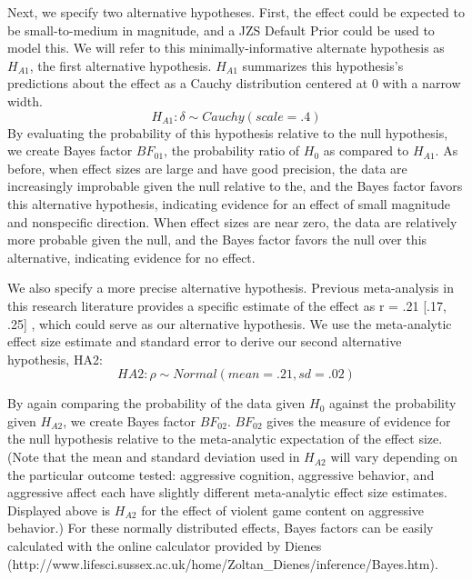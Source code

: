 \documentclass[fignum,nobf,man]{apa}
\begin{document}
Next, we specify two alternative hypotheses. First, the effect could be expected to be small-to-medium in magnitude, and a JZS Default Prior could be used to model this. We will refer to this minimally-informative alternate hypothesis as $H_{A1}$, the first alternative hypothesis. $H_{A1}$ summarizes this hypothesis's predictions about the effect as a Cauchy distribution centered at 0 with a narrow width.
\begin{equation}
H_{A1}: \delta{} \sim{} Cauchy(scale = .4) 
\end{equation}
By evaluating the probability of this hypothesis relative to the null hypothesis, we create Bayes factor $BF_{01}$, the probability ratio of $H_0$ as compared to $H_{A1}$. As before, when effect sizes are large and have good precision, the data are increasingly improbable given the null relative to the, and the Bayes factor favors this alternative hypothesis, indicating evidence for an effect of small magnitude and nonspecific direction. When effect sizes are near zero, the data are relatively more probable given the null, and the Bayes factor favors the null over this alternative, indicating evidence for no effect. 

We also specify a more precise alternative hypothesis. Previous meta-analysis in this research literature provides a specific estimate of the effect as r = .21 [.17, .25] \citep{Anderson:etal:2010}, which could serve as our alternative hypothesis.  We use the meta-analytic effect size estimate and standard error to derive our second alternative hypothesis, HA2:
\begin{equation}
HA2: \rho{} \sim{} Normal(mean=.21, sd=.02)
\end{equation}

By again comparing the probability of the data given $H_0$ against the probability given $H_{A2}$, we create Bayes factor $BF_{02}$. $BF_{02}$ gives the measure of evidence for the null hypothesis relative to the meta-analytic expectation of the effect size. (Note that the mean and standard deviation used in $H_{A2}$ will vary depending on the particular outcome tested: aggressive cognition, aggressive behavior, and aggressive affect each have slightly different meta-analytic effect size estimates. Displayed above is $H_{A2}$ for the effect of violent game content on aggressive behavior.) For these normally distributed effects, Bayes factors can be easily calculated with the online calculator provided by Dienes  (http://www.lifesci.sussex.ac.uk/home/Zoltan\_Dienes/inference/Bayes.htm). 
\end{document}
